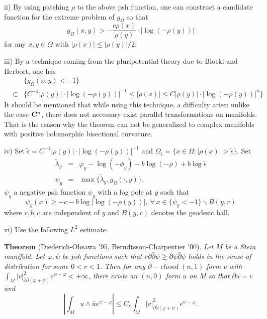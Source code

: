 \documentclass[12pt]{article}
\begin{document}
\bigskip

ii) By using patching $\rho$ to the above psh function, one can
construct a candidate function for the extreme problem of
$g_\Omega$ so that
$$
g_\Omega(x,y)>-\frac{c\rho(x)}{\rho(y)}\cdot|\log(-\rho(y))|
$$
for any $x,y\in \Omega$ with $|\rho(x)|\le |\rho(y)|/2$.

\bigskip

iii) By a technique coming from the pluripotential theory due to
Blocki and Herbort, one has
\begin{eqnarray*}
&& \{g_\Omega(x,y)<-1\}\\
&\subset & \{C^{-1}|\rho(y)|\cdot|\log (-\rho(y))|^{-1}\le
|\rho(x)|\le C |\rho(y)|\cdot|\log(-\rho(y))|^n\}
\end{eqnarray*}
It should be mentioned that while using this technique, a
difficulty arise: unlike the case ${\bf C}^n$, there does not
necessary exist parallel transformations on manifolds. That is the
reason why the theorem can not be generalized to complex manifolds
with positive holomorphic bisectional curvature.

\bigskip

iv) Set
$\tilde{\epsilon}=C^{-1}|\rho(y)|\cdot|\log(-\rho(y))|^{-1}$ and
$\Omega_{\tilde{\epsilon}}=\{x\in
\Omega:|\rho(x)|>\tilde{\epsilon}\}$. Set
\begin{eqnarray*}
\tilde{\lambda}_y &= & \varphi_y-\log(-\phi_y)-b\log(-\rho)+b\log
\tilde{\epsilon}\\
\psi_y &= & \max\{\tilde{\lambda}_y,g_\Omega(\cdot,y)\}.
\end{eqnarray*}
$\psi_y$ a negative psh function $\psi_y$ with a log pole at $y$
such that
$$
\psi_y(x) \ge   -c-b\log|\log(-\rho(y))|, \ \forall\, x\in
\{\psi_y<-1\}\backslash B(y,r)
$$
where $r,b,c$ are independent of $y$ and $B(y,r)$ denotes the
geodesic ball.

\bigskip

vi) Use the following $L^2$ estimate

\bigskip

{\bf Theorem} (Diederich-Ohsawa '95, Berndtsson-Charpentier '00).
{\em Let $M$ be a Stein manifold. Let $\varphi ,\psi $ be psh
functions such that $r\partial \bar
\partial \psi \ge
\partial \psi \bar \partial \psi $ holds in the sense of distribution for some $0<r<1$. Then for any
$\bar \partial-$closed $(n,1)$ form $v$ with $\int_M|v|_{\partial
\bar
\partial (\varphi +\psi )}^2e^{\psi -\varphi}<+\infty$, there exists an $(n,0)$ form $u$ on
$M$ so that $\bar
\partial u=v$ and}
\[
\left| \int_Mu\wedge \bar ue^{\psi -\varphi }\right| \le
C_r\int_M|v|_{\partial \bar \partial (\varphi +\psi )}^2e^{\psi
-\varphi }.
\]
\end{document}
